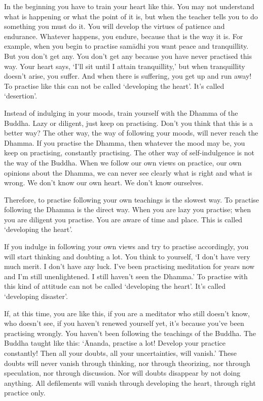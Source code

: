 In the beginning you have to train your heart like this. You may not understand what is happening or what the point of it is, but when the teacher tells you to do something you must do it. You will develop the virtues of patience and endurance. Whatever happens, you endure, because that is the way it is. For example, when you begin to practise sam\=adhi you want peace and tranquillity. But you don't get any. You don't get any because you have never practised this way. Your heart says, `I'll sit until I attain tranquillity,' but when tranquillity doesn't arise, you suffer. And when there is suffering, you get up and run away! To practise like this can not be called `developing the heart'. It's called `desertion'.

Instead of indulging in your moods, train yourself with the Dhamma of the Buddha. Lazy or diligent, just keep on practising. Don't you think that this is a better way? The other way, the way of following your moods, will never reach the Dhamma. If you practise the Dhamma, then whatever the mood may be, you keep on practising, constantly practising. The other way of self-indulgence is not the way of the Buddha. When we follow our own views on practice, our own opinions about the Dhamma, we can never see clearly what is right and what is wrong. We don't know our own heart. We don't know ourselves.

Therefore, to practise following your own teachings is the slowest way. To practise following the Dhamma is the direct way. When you are lazy you practise; when you are diligent you practise. You are aware of time and place. This is called `developing the heart'.

If you indulge in following your own views and try to practise accordingly, you will start thinking and doubting a lot. You think to yourself, `I don't have very much merit. I don't have any luck. I've been practising meditation for years now and I'm still unenlightened. I still haven't seen the Dhamma.' To practise with this kind of attitude can not be called `developing the heart'. It's called `developing disaster'.

If, at this time, you are like this, if you are a meditator who still doesn't know, who doesn't see, if you haven't renewed yourself yet, it's because you've been practising wrongly. You haven't been following the teachings of the Buddha. The Buddha taught like this: `\=Ananda, practise a lot! Develop your practice constantly! Then all your doubts, all your uncertainties, will vanish.' These doubts will never vanish through thinking, nor through theorizing, nor through speculation, nor through discussion. Nor will doubts disappear by not doing anything. All defilements will vanish through developing the heart, through right practice only.

